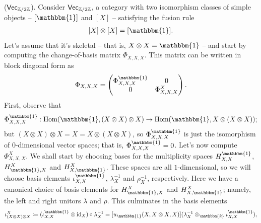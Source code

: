 \noindent\begin{example}\textup{($\textup{\textsf{Vec}}_{\mathbb{Z}/2\mathbb{Z}}$).} Consider $\textup{\textsf{Vec}}_{\mathbb{Z}/2\mathbb{Z}}$, a category with two isomorphism classes of simple objects -- $[\mathbbm{1}]$ and $[X]$ -- satisfying the fusion rule
\begin{align*}
\begin{split}
[X] \otimes [X] = [\mathbbm{1}].
\end{split}
\end{align*}
\noindent Let's assume that it's skeletal -- that is, $X \otimes X = \mathbbm{1}$ -- and start by computing the change-of-basis matrix $\Phi_{X,X,X}$. This matrix can be written in block diagonal form as
\begin{align*}
\begin{split}
\Phi_{X,X,X} = \begin{pmatrix}\Phi_{X,X,X}^\mathbbm{1}&0\\0&\Phi_{X,X,X}^X\end{pmatrix}.
\end{split}
\end{align*}
\noindent First, observe that
\begin{align*}
\begin{split}
\Phi_{X,X,X}^\mathbbm{1} : \homset(\mathbbm{1}, (X \otimes X) \otimes X) \to \homset(\mathbbm{1}, X \otimes (X \otimes X));
\end{split}
\end{align*}
\noindent but $(X \otimes X) \otimes X = X = X \otimes (X \otimes X)$, so $\Phi_{X,X,X}^\mathbbm{1}$ is just the isomorphism of $0$-dimensional vector spaces; that is, $\Phi_{X,X,X}^\mathbbm{1} = 0$. Let's now compute $\Phi_{X,X,X}^X$. %
We shall start by choosing bases for the multiplicity spaces $H_{X,X}^{{\mathbbm{1}}}$, $H_{{\mathbbm{1}},X}^X$ and $H_{X,{\mathbbm{1}}}^X$. These spaces are all $1$-dimensional, so we will choose basis elements $\iota_{X,X}^{{\mathbbm{1}}}$, $\lambda_X^{-1}$ and $\rho_X^{-1}$, respectively. Here we have a canonical choice of basis elements for $H_{{\mathbbm{1}},X}^X$ and $H_{X,{\mathbbm{1}}}^X$; namely, the left and right unitors $\lambda$ and $\rho$. This culminates in the basis elements
\begin{align*}
\begin{split}
\iota_{(X \otimes X) \otimes X}^X \coloneqq (\iota_{X,X}^{{\mathbbm{1}}} \otimes \id_X) \circ \lambda_X^{-1} = [u_{{\mathbbm{1}}}(X, X \otimes X, X)](\lambda_X^{-1} \otimes_\mathbbm{k} \iota_{X,X}^{{\mathbbm{1}}}),

\end{split}
\end{align*}
\end{example}
